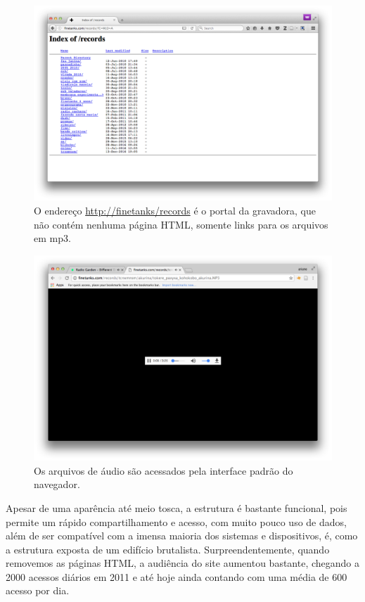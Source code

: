 \begin{figure}

\includegraphics[width=1\textwidth]{pictures/cap1/finetanksrecords}
\caption{O endereço \url{http://finetanks/records} é o portal da gravadora, que não contém nenhuma página HTML, somente links para os arquivos em mp3.}
\label{fig:finetanksrecords}
\end{figure}


\begin{figure}

\includegraphics[width=1\textwidth]{pictures/cap1/finetanksmp3}
\caption{Os arquivos de áudio são acessados pela interface padrão do navegador.}
\label{fig:finetanksmp3}
\end{figure}

Apesar de uma aparência até meio tosca, a estrutura é bastante funcional, pois permite um rápido compartilhamento e acesso, com muito pouco uso de dados, além de ser compatível com a imensa maioria dos sistemas e dispositivos, é, como a estrutura exposta de um edifício brutalista. Surpreendentemente, quando removemos as páginas HTML, a audiência do site aumentou bastante, chegando a 2000 acessos diários em 2011 e até hoje ainda contando com uma média de 600 acesso por dia.

